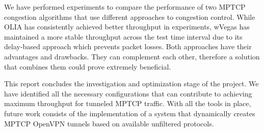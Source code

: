
We have performed experiments to compare the performance of two MPTCP congestion algorithms that use different approaches to congestion control. While OLIA has consistently achieved better throughput in experiments, wVegas has maintained a more stable throughput across the test time interval due to its delay-based approach which prevents packet losses. Both approaches have their advantages and drawbacks. They can complement each other, therefore a solution that combines them could prove extremely beneficial.

This report concludes the investigation and optimization stage of the project. We have identified all the necessary configurations that can contribute to achieving maximum throughput for tunneled MPTCP traffic. With all the tools in place, future work consists of the implementation of a system that dynamically creates MPTCP OpenVPN tunnels based on available unfiltered protocols.
